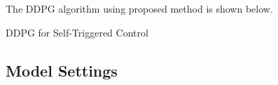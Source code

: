 \documentclass[english, dvipdfmx]{ampmt}             %
\begin{document}
\par
The DDPG algorithm using proposed method is shown below. \par
\begin{algorithm}                      
\caption{DDPG for Self-Triggered Control}         
\label{alg1}                          
\begin{algorithmic}                  
    \STATE Write me.
    \if0{
    \IF{$n < 0$}
    \STATE $X \Leftarrow 1 / x$
    \STATE $N \Leftarrow -n$
    \ELSE
    \STATE $X \Leftarrow x$
    \STATE $N \Leftarrow n$
    \ENDIF
    \WHILE{$N \neq 0$}
    \IF{$N$ is even}
    \STATE $X \Leftarrow X \times X$
    \STATE $N \Leftarrow N / 2$
    \ELSE[$N$ is odd]
    \STATE $y \Leftarrow y \times X$
    \STATE $N \Leftarrow N - 1$
    \ENDIF
    \ENDWHILE
    \fi
\end{algorithmic}
\end{algorithm}





\subsection{Model Settings}
\end{document}
